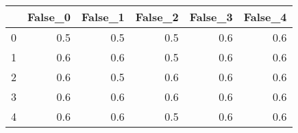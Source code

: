 \begin{tabular}{lrrrrr}
\toprule
{} &  False\_0 &  False\_1 &  False\_2 &  False\_3 &  False\_4 \\ \hline
\midrule
0 &      0.5 &      0.5 &      0.5 &      0.6 &      0.6 \\ \hline
1 &      0.6 &      0.6 &      0.5 &      0.6 &      0.6 \\ \hline
2 &      0.6 &      0.5 &      0.6 &      0.6 &      0.6 \\ \hline
3 &      0.6 &      0.6 &      0.6 &      0.6 &      0.6 \\ \hline
4 &      0.6 &      0.6 &      0.5 &      0.6 &      0.6 \\ \hline
\bottomrule
\end{tabular}

